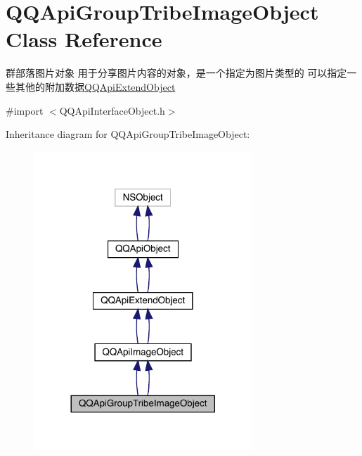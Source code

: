 \hypertarget{interface_q_q_api_group_tribe_image_object}{}\section{Q\+Q\+Api\+Group\+Tribe\+Image\+Object Class Reference}
\label{interface_q_q_api_group_tribe_image_object}


群部落图片对象 用于分享图片内容的对象，是一个指定为图片类型的 可以指定一些其他的附加数据{\ttfamily \mbox{\hyperlink{interface_q_q_api_extend_object}{Q\+Q\+Api\+Extend\+Object}}}  




{\ttfamily \#import $<$Q\+Q\+Api\+Interface\+Object.\+h$>$}



Inheritance diagram for Q\+Q\+Api\+Group\+Tribe\+Image\+Object\+:\nopagebreak
\begin{figure}[H]
\begin{center}
\leavevmode
\includegraphics[width=233pt]{interface_q_q_api_group_tribe_image_object__inherit__graph}
\end{center}
\end{figure}


